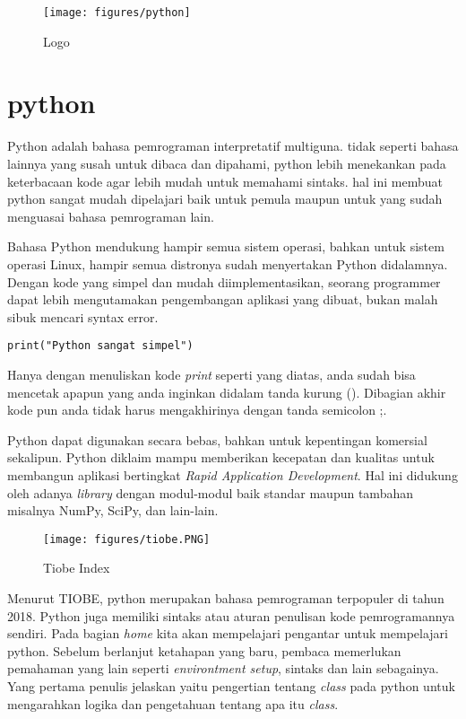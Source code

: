 
\sloppy

\begin{figure}[ht]
	\centerline{\texttt{[image: figures/python]}}
	\caption{Logo}
	\label{Logo} 
\end{figure}

\section{python}

Python adalah bahasa pemrograman interpretatif multiguna. tidak seperti bahasa lainnya yang susah untuk dibaca dan dipahami, python lebih menekankan pada keterbacaan kode agar lebih mudah untuk memahami sintaks. hal ini membuat python sangat mudah dipelajari baik untuk pemula maupun untuk yang sudah menguasai bahasa pemrograman lain.

Bahasa Python mendukung hampir semua sistem operasi, bahkan untuk sistem operasi Linux, hampir semua distronya sudah menyertakan Python didalamnya. Dengan kode yang simpel dan mudah diimplementasikan, seorang programmer dapat lebih mengutamakan pengembangan aplikasi yang dibuat, bukan malah sibuk mencari syntax error.

\begin{verbatim}
print("Python sangat simpel")
\end{verbatim}

Hanya dengan menuliskan kode \textit{print} seperti yang diatas, anda sudah bisa mencetak apapun yang anda inginkan didalam tanda kurung (). Dibagian akhir kode pun anda tidak harus mengakhirinya dengan tanda semicolon ;.

Python dapat digunakan secara bebas, bahkan untuk kepentingan komersial sekalipun. Python diklaim mampu memberikan kecepatan dan kualitas untuk membangun aplikasi bertingkat \textit{Rapid Application Development}. Hal ini didukung oleh adanya \textit{library} dengan modul-modul baik standar maupun tambahan misalnya NumPy, SciPy, dan lain-lain.


\begin{figure}[!htbp]
\centerline{\texttt{[image: figures/tiobe.PNG]}}
\caption{Tiobe Index}
\label{tiobe}
\end{figure}

Menurut TIOBE, python merupakan bahasa pemrograman terpopuler di tahun 2018. Python juga memiliki sintaks atau aturan penulisan kode pemrogramannya sendiri. Pada bagian \textit{home} kita akan mempelajari pengantar untuk mempelajari python. Sebelum berlanjut ketahapan yang baru, pembaca memerlukan pemahaman yang lain seperti \textit{environtment setup}, sintaks dan lain sebagainya. Yang pertama penulis jelaskan yaitu pengertian tentang \textit{class} pada python untuk mengarahkan logika dan pengetahuan tentang apa itu \textit{class}.

